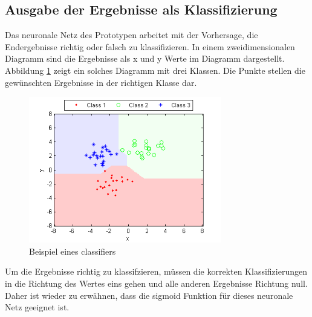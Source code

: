 \subsection{Ausgabe der Ergebnisse als Klassifizierung}
Das neuronale Netz des Prototypen arbeitet mit der Vorhersage, die Endergebnisse richtig oder falsch zu klassifizieren. In einem zweidimensionalen Diagramm sind die Ergebnisse als x und y Werte im Diagramm dargestellt. Abbildung \ref{fig:nn_class} zeigt ein solches Diagramm mit drei Klassen. Die Punkte stellen die gewünschten Ergebnisse in der richtigen Klasse dar.

\begin{figure}[H]
	\centering
		\includegraphics[width=0.75\textwidth]{images/nn_classifier.png}
	\caption{Beispiel eines classifiers}
	\label{fig:nn_class}
\end{figure}

Um die Ergebnisse richtig zu klassifzieren, müssen die korrekten Klassifizierungen in die Richtung des Wertes eins gehen und alle anderen Ergebnisse Richtung null. Daher ist wieder zu erwähnen, dass die sigmoid Funktion für dieses neuronale Netz geeignet ist.

